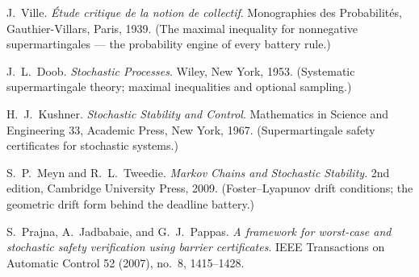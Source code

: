 
J.~Ville.
\emph{\'Etude critique de la notion de collectif}.
Monographies des Probabilit\'es, Gauthier-Villars, Paris, 1939.
(The maximal inequality for nonnegative supermartingales --- the
probability engine of every battery rule.)

J.~L.~Doob.
\emph{Stochastic Processes}.
Wiley, New York, 1953. (Systematic supermartingale theory; maximal
inequalities and optional sampling.)

H.~J.~Kushner.
\emph{Stochastic Stability and Control}.
Mathematics in Science and Engineering 33, Academic Press, New York,
1967. (Supermartingale safety certificates for stochastic systems.)

S.~P.~Meyn and R.~L.~Tweedie.
\emph{Markov Chains and Stochastic Stability}.
2nd edition, Cambridge University Press, 2009. (Foster--Lyapunov drift
conditions; the geometric drift form behind the deadline battery.)

S.~Prajna, A.~Jadbabaie, and G.~J.~Pappas.
\emph{A framework for worst-case and stochastic safety verification
using barrier certificates}.
IEEE Transactions on Automatic Control 52 (2007), no.~8, 1415--1428.
